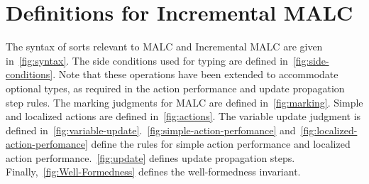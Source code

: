 

\section{Definitions for Incremental MALC}

The syntax of sorts relevant to MALC and Incremental MALC are given in~\autoref{fig:syntax}. The side conditions used for typing are defined in~\autoref{fig:side-conditions}. Note that these operations have been extended to accommodate optional types, as required in the action performance and update propagation step rules. The marking judgments for MALC are defined in~\autoref{fig:marking}. Simple and localized actions are defined in~\autoref{fig:actions}. The variable update judgment is defined in~\autoref{fig:variable-update}.~\autoref{fig:simple-action-perfomance} and~\autoref{fig:localized-action-perfomance} define the rules for simple action performance and localized action performance.~\autoref{fig:update} defines update propagation steps. Finally,~\autoref{fig:Well-Formedness} defines the well-formedness invariant. 


